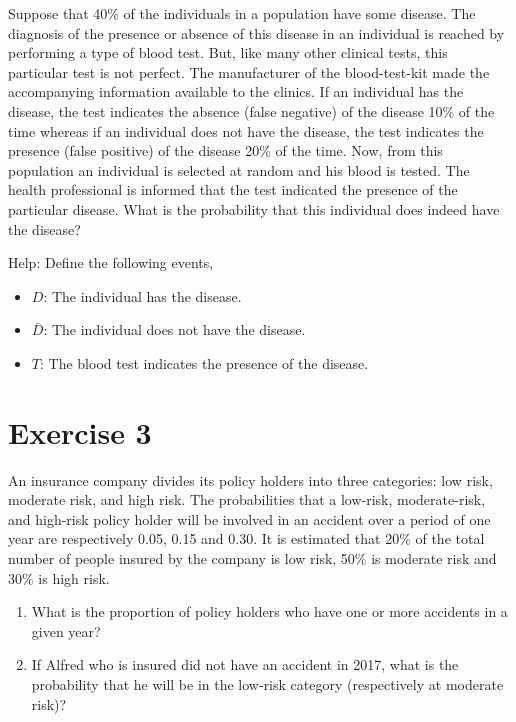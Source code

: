 \documentclass[12pt,thmsa]{article}
\begin{document}
Suppose that 40\% of the individuals in a population have some disease. The diagnosis of the presence or absence of this disease in an individual is reached by performing a type of blood test. But, like many other clinical tests, this particular test is not perfect. The manufacturer of the blood-test-kit made the accompanying information available to the clinics. If an individual has the disease, the test indicates the absence (false negative) of the disease 10\% of the time whereas if an individual does not have the disease, the test indicates the presence (false positive) of the disease 20\% of the time. Now, from this population an individual is selected at random and his blood is tested. The health professional is informed that the test indicated the presence of the particular disease. What is the probability that this individual does indeed have the disease? 

Help: Define the following events,
\begin{itemize}
\item $ D $: The individual has the disease.
\item $ \bar{D} $: The individual does not have the disease.
\item $ T $: The blood test indicates the presence of the disease.
\end{itemize}


\section*{Exercise 3}

An insurance company divides its policy holders into three categories: low risk, moderate risk, and high risk. The probabilities that a low-risk, moderate-risk, and high-risk policy holder will be involved in an accident over a period of one year are respectively 0.05, 0.15 and 0.30. It is estimated that 20\% of the total number of people insured by the company is low risk, 50\% is moderate risk and 30\% is high risk. 

\begin{enumerate}
	\item What is the proportion of policy holders who have one or more accidents in a given year?
	\item If Alfred who is insured did not have an accident in 2017, what is the probability that he will be in the low-risk category (respectively at moderate risk)?
\end{enumerate}
\end{document}
